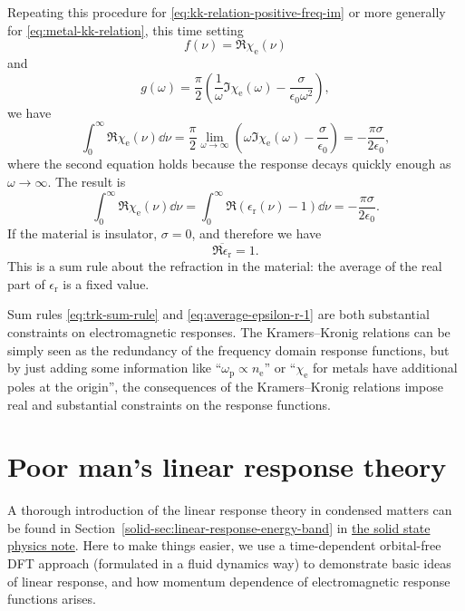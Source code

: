 \documentclass[hyperref, a4paper]{article}
\newcommand{\soliddoc}{\href{../solid/solid}{the solid state physics note}}
\begin{document}
Repeating this procedure for \eqref{eq:kk-relation-positive-freq-im} or more generally for \eqref{eq:metal-kk-relation}, this time setting 
\[
    f(\nu) = \Re \chi_\text{e}(\nu)
\]
and 
\[
    g(\omega) = \frac{\pi}{2} \left( \frac{1}{\omega} \Im \chi_\text{e}(\omega) - \frac{\sigma}{\epsilon_0 \omega^2} \right),
\]
we have
\[
    \int_0^\infty \Re \chi_\text{e}(\nu) \dd{\nu} = \frac{\pi}{2} \lim_{\omega \to \infty} \left( \omega \Im \chi_\text{e}(\omega) - \frac{\sigma }{\epsilon_0 } \right) = - \frac{\pi \sigma}{2 \epsilon_0},
\]
where the second equation holds because the response decays quickly enough as $\omega \to \infty$.
The result is 
\begin{equation}
    \int_0^\infty \Re \chi_\text{e}(\nu) \dd{\nu} = \int_0^\infty \Re (\epsilon_\text{r}(\nu) - 1) \dd{\nu} = - \frac{\pi \sigma}{2\epsilon_0}.
\end{equation}
If the material is insulator, $\sigma = 0$, and therefore we have 
\begin{equation}
    \overline{\Re \epsilon_\text{r}} = 1.
    \label{eq:average-epsilon-r-1}
\end{equation}
This is a sum rule about the refraction in the material: the average of the real part of $\epsilon_\text{r}$ is a fixed value.

Sum rules \eqref{eq:trk-sum-rule} and \eqref{eq:average-epsilon-r-1} are both substantial constraints on electromagnetic responses.
The Kramers–Kronig relations can be simply seen as the redundancy of the frequency domain response functions, but by just adding some information like ``$\omega_\text{p} \propto n_\text{e}$'' or ``$\chi_\text{e}$ for metals have additional poles at the origin'', the consequences of the Kramers–Kronig relations impose real and substantial constraints on the response functions.

\section{Poor man's linear response theory}

A thorough introduction of the linear response theory in condensed matters can be found in Section~\ref{solid-sec:linear-response-energy-band} in \soliddoc.
Here to make things easier, we use a time-dependent orbital-free DFT approach (formulated in a fluid dynamics way) to demonstrate basic ideas of linear response, and how momentum dependence of electromagnetic response functions arises.
\end{document}

